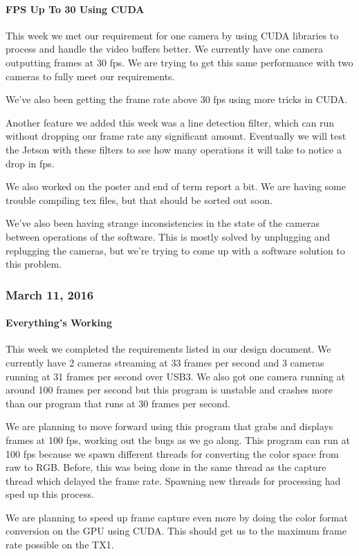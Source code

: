 \paragraph{FPS Up To 30 Using CUDA}
This week we met our requirement for one camera by using CUDA libraries to process and handle the video buffers better. We currently have one camera outputting frames at 30 fps. We are trying to get this same performance with two cameras to fully meet our requirements.
\par
We've also been getting the frame rate above 30 fps using more tricks in CUDA.
\par
Another feature we added this week was a line detection filter, which can run without dropping our frame rate any significant amount. Eventually we will test the Jetson with these filters to see how many operations it will take to notice a drop in fps.
\par
We also worked on the poster and end of term report a bit. We are having some trouble compiling tex files, but that should be sorted out soon.
\par
We've also been having strange inconsistencies in the state of the cameras between operations of the software. This is mostly solved by unplugging and replugging the cameras, but we're trying to come up with a software solution to this problem.\\

\subsubsection{March 11, 2016}
\paragraph{Everything's Working} 
This week we completed the requirements listed in our design document. We currently have 2 cameras streaming at 33 frames per second and 3 cameras running at 31 frames per second over USB3. We also got one camera running at around 100 frames per second but this program is unstable and crashes more than our program that runs at 30 frames per second.
\par
We are planning to move forward using this program that grabs and displays frames at 100 fps, working out the bugs as we go along. This program can run at 100 fps because we spawn different threads for converting the color space from raw to RGB. Before, this was being done in the same thread as the capture thread which delayed the frame rate. Spawning new threads for processing had sped up this process.
\par
We are planning to speed up frame capture even more by doing the color format conversion on the GPU using CUDA. This should get us to the maximum frame rate possible on the TX1.\\